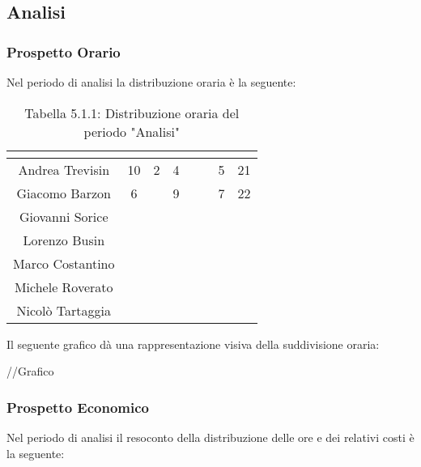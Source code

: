\subsection{Analisi}

\subsubsection{Prospetto Orario}
Nel periodo di analisi la distribuzione oraria è la seguente:

\renewcommand{\arraystretch}{1.5}
\begin{table}[H]
\begin{center}
\begin{tabular}{|c|c|c|c|c|c|c|c|}
\hline
\rowcolor{title_row}
\textbf{\color{title_text}{Nome}} & \textbf{\color{title_text}{Resp.}} & \textbf{\color{title_text}{Ammi.}} & \textbf{\color{title_text}{Analist.}} & \textbf{\color{title_text}{Progett.}} & \textbf{\color{title_text}{Program.}} & \textbf{\color{title_text}{Verific.}} & \textbf{\color{title_text}{Totale}} \\ \hline
Andrea Trevisin  &10 &2 &4 & & &5 &21  \\ \hline
Giacomo Barzon   &6 & &9 & & &7 &22  \\ \hline
Giovanni Sorice  & & & & & & &  \\ \hline
Lorenzo Busin    & & & & & & &  \\ \hline
Marco Costantino & & & & & & &  \\ \hline
Michele Roverato & & & & & & &  \\ \hline
Nicolò Tartaggia & & & & & & &  \\ \hline
\end{tabular}
\caption{Tabella 5.1.1: Distribuzione oraria del periodo "Analisi"\label{}}
\end{center}
\end{table}
\renewcommand{\arraystretch}{1}

Il seguente grafico dà una rappresentazione visiva della suddivisione oraria: \\
\begin{center}
//Grafico
\end{center}


\subsubsection{Prospetto Economico}
Nel periodo di analisi il resoconto della distribuzione delle ore e dei relativi costi è la seguente:

